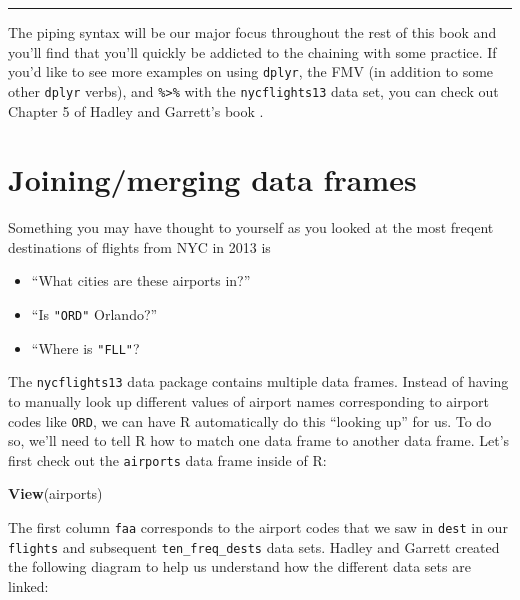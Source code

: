 \documentclass[]{tufte-book}
\newenvironment{Shaded}{\begin{snugshade}}{\end{snugshade}}
\newcommand{\KeywordTok}[1]{\textcolor[rgb]{0.13,0.29,0.53}{\textbf{{#1}}}}
\newcommand{\NormalTok}[1]{{#1}}
\let\oldrule=\rule
\renewcommand{\rule}[1]{\oldrule{\linewidth}}
\providecommand{\tightlist}{%
  \setlength{\itemsep}{0pt}\setlength{\parskip}{0pt}}
\begin{document}
\begin{center}\rule{0.5\linewidth}{\linethickness}\end{center}

The piping syntax will be our major focus throughout the rest of this
book and you'll find that you'll quickly be addicted to the chaining
with some practice. If you'd like to see more examples on using
\texttt{dplyr}, the FMV (in addition to some other \texttt{dplyr}
verbs), and \texttt{\%\textgreater{}\%} with the \texttt{nycflights13}
data set, you can check out Chapter 5 of Hadley and Garrett's book
\citep{rds2016}.

\section{Joining/merging data frames}\label{joiningmerging-data-frames}

Something you may have thought to yourself as you looked at the most
freqent destinations of flights from NYC in 2013 is

\begin{itemize}
\tightlist
\item
  ``What cities are these airports in?''
\item
  ``Is \texttt{"ORD"} Orlando?''
\item
  ``Where is \texttt{"FLL"}?
\end{itemize}

The \texttt{nycflights13} data package contains multiple data frames.
Instead of having to manually look up different values of airport names
corresponding to airport codes like \texttt{ORD}, we can have R
automatically do this ``looking up'' for us. To do so, we'll need to
tell R how to match one data frame to another data frame. Let's first
check out the \texttt{airports} data frame inside of R:

\begin{Shaded}
\begin{Highlighting}[]
\KeywordTok{View}\NormalTok{(airports)}
\end{Highlighting}
\end{Shaded}

The first column \texttt{faa} corresponds to the airport codes that we
saw in \texttt{dest} in our \texttt{flights} and subsequent
\texttt{ten\_freq\_dests} data sets. Hadley and Garrett \citep{rds2016}
created the following diagram to help us understand how the different
data sets are linked:
\end{document}
